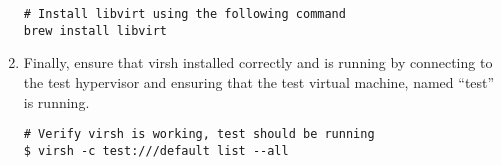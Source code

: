 \begin{enumerate}
\lstset{language=bash caption=Install libvirt}
\begin{lstlisting}
# Install libvirt using the following command
brew install libvirt
\end{lstlisting}

\item 	Finally, ensure that virsh installed correctly and is running by connecting to the test hypervisor and ensuring 
		that the test virtual machine, named ``test'' is running.

\lstset{language=bash,caption=Verify virsh was Installed Properly}
\begin{lstlisting}
# Verify virsh is working, test should be running
$ virsh -c test:///default list --all
\end{lstlisting}
\end{enumerate}




